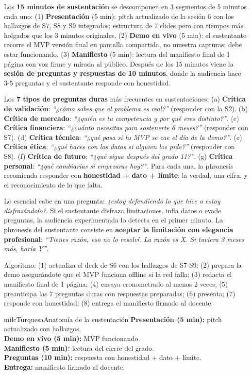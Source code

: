\documentclass[11pt,letterpaper]{article}
\newcommand{\milcpaso}[3]{%
\Needspace{4\baselineskip}%
\begin{tcolorbox}[enhanced,colback=white,colframe=milcLinea,arc=1.5mm,boxrule=.9pt,
  left=14mm,right=4mm,top=3mm,bottom=3mm,before skip=4pt,after skip=4pt,
  fontupper=\RaggedRight,
  overlay={\node[anchor=north west,circle,fill=#2,text=white,inner sep=0pt,
    minimum size=7.4mm,font=\sffamily\bfseries\small]
    at ([xshift=3.6mm,yshift=-3.2mm]frame.north west) {#1};}]
#3
\end{tcolorbox}}
\begin{document}
\milcpaso{1}{milcTurquesa}{Los \textbf{15 minutos de sustentación} se descomponen en 3 segmentos de 5 minutos cada uno: (1) \textbf{Presentación} (5 min): pitch actualizado de la sesión 6 con los hallazgos de S7, S8 y S9 integrados; estructura de 7 slides pero con tiempos más holgados que los 3 minutos originales. (2) \textbf{Demo en vivo} (5 min): el sustentante recorre el MVP versión final en pantalla compartida, no muestra capturas; debe estar funcionando. (3) \textbf{Manifiesto} (5 min): lectura del manifiesto final de 1 página con voz firme y mirada al público. Después de los 15 minutos viene la \textbf{sesión de preguntas y respuestas de 10 minutos}, donde la audiencia hace 3-5 preguntas y el sustentante responde con honestidad.}
\milcpaso{2}{milcTurquesa}{Los \textbf{7 tipos de preguntas duras} más frecuentes en sustentaciones: (a) \textbf{Crítica de validación}: \emph{``¿cómo sabes que el problema es real?''} (responder con la S2). (b) \textbf{Crítica de mercado}: \emph{``¿quién es tu competencia y por qué eres distinto?''}. (c) \textbf{Crítica financiera}: \emph{``¿cuánto necesitas para sostenerte 6 meses?''} (responder con S7). (d) \textbf{Crítica técnica}: \emph{``¿qué pasa si tu MVP se cae el día de la demo?''}. (e) \textbf{Crítica ética}: \emph{``¿qué haces con los datos si alguien los pide?''} (responder con S8). (f) \textbf{Crítica de futuro}: \emph{``¿qué sigue después del grado 11?''}. (g) \textbf{Crítica personal}: \emph{``¿qué cambiarías si empezaras hoy?''}. Para cada una, la phronesis recomienda responder con \textbf{honestidad + dato + límite}: la verdad, una cifra, y el reconocimiento de lo que falta.}
\milcpaso{3}{milcTurquesa}{Lo esencial cabe en una pregunta: \emph{¿estoy defendiendo lo que hice o estoy disfrazándolo?}. Si el sustentante disfraza limitaciones, infla datos o evade preguntas, la audiencia experimentada lo detecta en el primer minuto. La phronesis del sustentante consiste en \textbf{aceptar la limitación con elegancia profesional}: \emph{``Tienes razón, eso no lo resolví. La razón es X. Si tuviera 3 meses más, haría Y''}.}
\milcpaso{4}{milcTurquesa}{Algoritmo: (1) actualiza el deck de S6 con los hallazgos de S7-S9; (2) prepara la demo asegurándote que el MVP funciona offline si la red falla; (3) redacta el manifiesto final de 1 página; (4) ensaya cronometrado al menos 2 veces; (5) preanticipa las 7 preguntas duras con respuestas preparadas; (6) presenta; (7) responde con honestidad; (8) entrega el manifiesto firmado al docente.}

\begin{drawbox}{milcTurquesa}{Anatomía de la sustentación}
\textbf{Presentación (5 min):} pitch actualizado con hallazgos. \\[1mm] \textbf{Demo en vivo (5 min):} MVP funcionando. \\[1mm] \textbf{Manifiesto (5 min):} lectura del cierre del grado. \\[1mm] \textbf{Preguntas (10 min):} respuesta con honestidad + dato + límite. \\[1mm] \textbf{Entrega:} manifiesto firmado al docente.
\end{drawbox}
\end{document}
